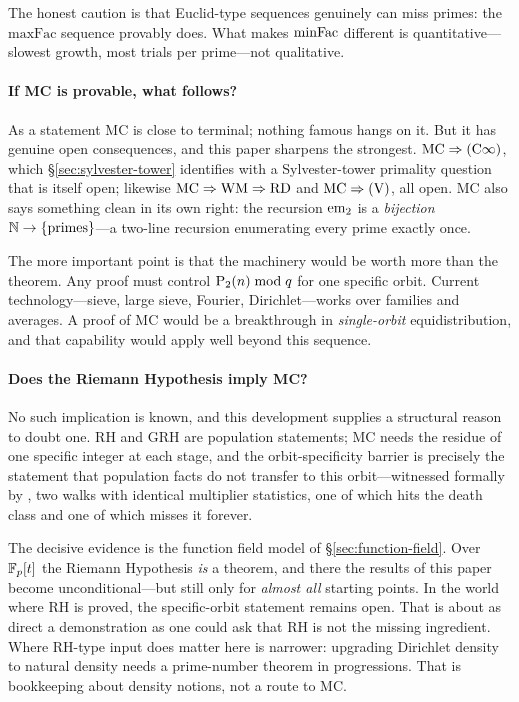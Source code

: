 The honest caution is that Euclid-type sequences genuinely can miss
primes: the $\mathrm{maxFac}$ sequence provably does.  What makes
$\mathrm{minFac}$ different is quantitative---slowest growth, most trials per
prime---not qualitative.

\paragraph{If MC is provable, what follows?}
As a statement MC is close to terminal; nothing famous hangs on it.  But
it has genuine open consequences, and this paper sharpens the strongest.
$\mathrm{MC} \Rightarrow (\mathrm{C}\infty)$, which
\S\ref{sec:sylvester-tower} identifies with a Sylvester-tower primality
question that is itself open; likewise
$\mathrm{MC} \Rightarrow \mathrm{WM} \Rightarrow \mathrm{RD}$ and
$\mathrm{MC} \Rightarrow (\mathrm{V})$, all open.  MC also says something clean
in its own right: the recursion $\mathrm{em}_{2}$ is a \emph{bijection}
$\mathbb{N} \to \{\text{primes}\}$---a two-line recursion enumerating every
prime exactly once.

The more important point is that the machinery would be worth more than
the theorem.  Any proof must control $\mathrm{P}_{2}(n) \bmod q$ for one
specific orbit.  Current technology---sieve, large sieve, Fourier,
Dirichlet---works over families and averages.  A proof of MC would be a
breakthrough in \emph{single-orbit} equidistribution, and that capability
would apply well beyond this sequence.

\paragraph{Does the Riemann Hypothesis imply MC?}
No such implication is known, and this development supplies a structural
reason to doubt one.  RH and GRH are population statements; MC needs the
residue of one specific integer at each stage, and the orbit-specificity
barrier is precisely the statement that population facts do not transfer
to this orbit---witnessed formally by
,
two walks with identical multiplier statistics, one of which hits the
death class and one of which misses it forever.

The decisive evidence is the function field model of
\S\ref{sec:function-field}.  Over $\mathbb{F}_p[t]$ the Riemann Hypothesis
\emph{is} a theorem, and there the results of this paper become
unconditional---but still only for \emph{almost all} starting points.  In
the world where RH is proved, the specific-orbit statement remains open.
That is about as direct a demonstration as one could ask that RH is not
the missing ingredient.  Where RH-type input does matter here is
narrower: upgrading Dirichlet density to natural density needs a
prime-number theorem in progressions.  That is bookkeeping about density
notions, not a route to MC.

